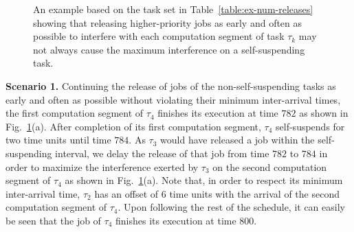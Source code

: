 \begin{figure}[t]
{{} }
\caption{An example based on the task set in Table~\ref{table:ex-num-releases} showing that releasing higher-priority jobs as early and often as possible to interfere with each computation segment of task $\tau_k$ may not always cause the maximum interference on a self-suspending task.}
\label{fig:ex_crit_inst2}
\end{figure}

\noindent\textbf{Scenario 1.} Continuing the release of jobs of the non-self-suspending tasks as early and often as possible without violating their minimum inter-arrival times, the first computation segment of $\tau_4$ finishes its execution at time $782$ as shown in Fig.~\ref{fig:ex_crit_inst2}(a). After completion of its first computation segment, $\tau_4$ self-suspends for two time units until time $784$. As $\tau_3$ would have released a job within the self-suspending interval, we delay the release of that job from time $782$ to $784$ in order to maximize the interference exerted by $\tau_3$ on the second computation segment of $\tau_4$ as shown in Fig.~\ref{fig:ex_crit_inst2}(a). Note that, in order to respect its minimum inter-arrival time, $\tau_2$ has an offset of $6$ time units with the arrival of the second computation segment of $\tau_4$. Upon following the rest of the schedule, it can easily be seen that the job of $\tau_4$ finishes its execution at time $800$.

